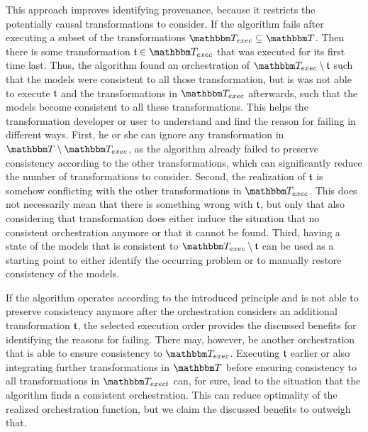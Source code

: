 This approach improves identifying provenance, because it restricts the potentially causal transformations to consider.
If the algorithm fails after executing a subset of the transformations $\transformationset{T}_{exec} \subseteq \transformationset{T}$.
Then there is some transformation $\transformation{t} \in \transformationset{T}_{exec}$ that was executed for its first time last.
Thus, the algorithm found an orchestration of $\transformationset{T}_{exec} \setminus \transformation{t}$ such that the models were consistent to all those transformation, but is was not able to execute $\mathfrak{t}$ and the transformations in $\transformationset{T}_{exec}$ afterwards, such that the models become consistent to all these transformations.
This helps the transformation developer or user to understand and find the reason for failing in different ways.
First, he or she can ignore any transformation in $\transformationset{T} \setminus \transformationset{T}_{exec}$, as the algorithm already failed to preserve consistency according to the other transformations, which can significantly reduce the number of transformations to consider.
Second, the realization of $\mathfrak{t}$ is somehow conflicting with the other transformations in $\transformationset{T}_{exec}$. This does not necessarily mean that there is something wrong with $\mathfrak{t}$, but only that also considering that transformation does either induce the situation that no consistent orchestration anymore or that it cannot be found.
Third, having a state of the models that is consistent to $\transformationset{T}_{exec} \setminus \transformation{t}$ can be used as a starting point to either identify the occurring problem or to manually restore consistency of the models.

If the algorithm operates according to the introduced principle and is not able to preserve consistency anymore after the orchestration considers an additional transformation $\mathfrak{t}$, the selected execution order provides the discussed benefits for identifying the reasons for failing.
There may, however, be another orchestration that is able to ensure consistency to $\transformationset{T}_{exec}$. Executing $\mathfrak{t}$ earlier or also integrating further transformations in $\transformationset{T}$ before ensuring consistency to all transformations in $\transformationset{T}_{exect}$ can, for sure, lead to the situation that the algorithm finds a consistent orchestration.
This can reduce optimality of the realized orchestration function, but we claim the discussed benefits to outweigh that.

